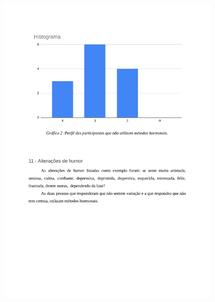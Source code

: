 \begin{apendicesenv}
        \begin{figure}[ht]
            \centering
            \includegraphics[keepaspectratio=true,scale=0.7]{figuras/Tab9.pdf}
        \end{figure}
        

\end{apendicesenv}
